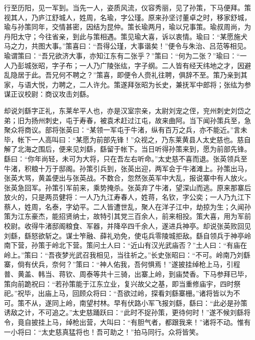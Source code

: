 行至历阳，见一军到。当先一人，姿质风流，仪容秀丽，见了孙策，下马便拜。策视其人，乃庐江舒城人，姓周，名瑜，字公瑾。原来孙坚讨董卓之时，移家舒城，瑜与孙策同年，交情甚密，因结为昆仲。策长瑜两月，瑜以兄事策。瑜叔周尚，为丹阳太守；今往省亲，到此与策相遇。策见瑜大喜，诉以衷情。瑜曰：“某愿施犬马之力，共图大事。”策喜曰：“吾得公瑾，大事谐矣！”便令与朱治、吕范等相见。瑜谓策曰：“吾兄欲济大事，亦知江东有二张乎？”策曰：“何为二张？”瑜曰：“一人乃彭城张昭，字子布；一人乃广陵张纮，字子纲。二人皆有经天纬地之才，因避乱隐居于此。吾兄何不聘之？”策喜，即便令人赍礼往聘，俱辞不至。策乃亲到其家，与语大悦，力聘之，二人许允。策遂拜张昭为长史，兼抚军中郎将；张纮为参谋正议校尉：商议攻击刘繇。

却说刘繇字正礼，东莱牟平人也，亦是汉室宗亲，太尉刘宠之侄，兖州刺史刘岱之弟；旧为扬州刺史，屯于寿春，被袁术赶过江屯，故来曲阿。当下闻孙策兵至，急聚众将商议。部将张英曰：“某领一军屯于牛渚，纵有百万之兵，亦不能近。”言未毕，帐下一人高叫曰：“某愿为前部先锋！”众视之，乃东莱黄县人太史慈也。慈自解了北海之围后，便来见刘繇，繇留于帐下。当日听得孙策来到，愿为前部先锋。繇曰：“你年尚轻，未可为大将，只在吾左右听命。”太史慈不喜而退。张英领兵至牛渚，积粮十万于邸阁。孙策引兵到，张英出迎，两军会于牛渚滩上。孙策出马，张英大骂，黄盖便出与张英战。不数合，忽然张英军中大乱，报说寨中有人放火。张英急回军。孙策引军前来，乘势掩杀。张英弃了牛渚，望深山而逃。原来那寨后放火的，只是两员健将：一人乃九江寿春人，姓蒋，名钦，字公奕；一人乃九江下蔡人，姓周，名泰，字幼平。二人皆遭世乱，聚人在洋子江中，劫掠为生；久闻孙策为江东豪杰，能招贤纳士，故特引其党三百余人，前来相投。策大喜，用为军前校尉。收得牛渚邸阁粮食、军器，并降卒四千余人，遂进兵神亭。却说张英败回见刘繇，繇怒欲斩之。谋士笮融、薛礼劝免，使屯兵零陵城拒敌。繇自领兵于神亭岭南下营，孙策于岭北下营。策问土人曰：“近山有汉光武庙否？”土人曰：“有庙在岭上。”策曰：“吾夜梦光武召我相见，当往祈之。”长史张昭曰：“不可。岭南乃刘繇寨，倘有伏兵，奈何？”策曰：“神人佑我，吾何惧焉！”遂披挂绰枪上马，引程普、黄盖、韩当、蒋钦、周泰等共十三骑，出寨上岭，到庙焚香。下马参拜已毕，策向前跪祝曰：“若孙策能于江东立业，复兴故父之基，即当重修庙宇，四时祭祀。”祝毕，出庙上马，回顾众将曰：“吾欲过岭，探看刘繇寨栅。”诸将皆以为不可。策不从，遂同上岭，南望村林。早有伏路小军飞报刘繇，繇曰：“此必是孙策诱敌之计，不可追之。”太史慈踊跃曰：“此时不捉孙策，更待何时！”遂不候刘繇将令，竟自披挂上马，绰枪出营，大叫曰：“有胆气者，都跟我来！”诸将不动。惟有一小将曰：“太史慈真猛将也！吾可助之！”拍马同行。众将皆笑。

